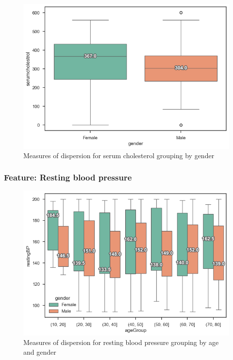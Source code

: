 \begin{figure}[H]
    \caption{Measures of dispersion for serum cholesterol grouping by gender}\label{boxplot-cholesterol-gender}
    \centering
    \includegraphics[width=\linewidth]{media/boxplot-06-gender-cholesterol.png}
\end{figure}

\subsubsection{Feature: Resting blood pressure}

\begin{figure}[H]
    \caption{Measures of dispersion for resting blood pressure grouping by age and gender}\label{boxplot-bp-age}
    \centering
    \includegraphics[width=\linewidth]{media/boxplot-07-agegroup-gender-bp.png}
\end{figure}

